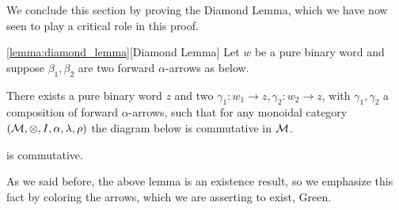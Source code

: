     We conclude this section by proving the Diamond Lemma, which we have now 
    seen to play a critical role in this proof. 
    \begin{customlemma}{\ref{lemma:diamond_lemma}}[Diamond Lemma]
        Let $w$ be a pure binary word and suppose $\beta_1,\beta_2$ are two 
        forward $\alpha$-arrows as below.
        \begin{center}
        \end{center}
        There exists a pure binary word $z$ and two $\gamma_1: w_1 \to z, \gamma_2: w_2 \to z$,
        with $\gamma_1, \gamma_2$ a composition of forward $\alpha$-arrows,
        such that for any monoidal category 
        $(\mathcal{M}, \otimes, I, \alpha, \lambda, \rho)$ the diagram below is 
        commutative in $\mathcal{M}$.
        \begin{center}
        \end{center}
        is commutative. 
    \end{customlemma}

    As we said before, the above lemma is an existence result, 
    so we emphasize this fact by coloring 
    the arrows, which we are asserting to exist, Green. 

